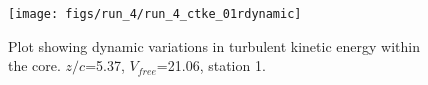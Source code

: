\begin{figure}[H]
\centering
\texttt{[image: figs/run\_4/run\_4\_ctke\_01rdynamic]}
\caption{Plot showing dynamic variations in turbulent kinetic energy within the core. $z/c$=5.37, $V_{free}$=21.06, station 1.}
\label{fig:run_4_ctke_01rdynamic}
\end{figure}


